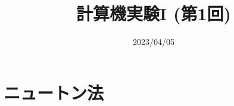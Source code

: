\documentclass[10pt,dvipdfmx]{beamer}
\title{計算機実験I (第1回)}
\date{2023/04/05}
\begin{document}
\begin{frame}
  \titlepage
  \tableofcontents
\end{frame}







\section{ニュートン法}













\end{document}
